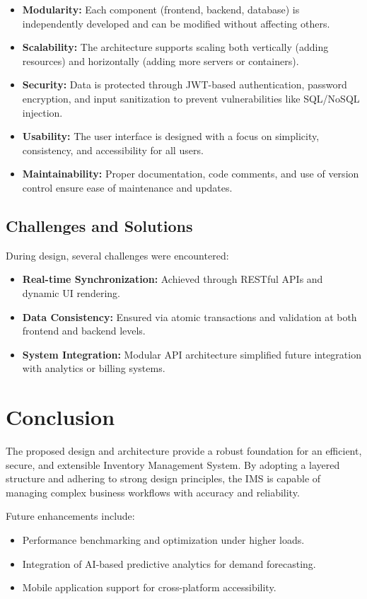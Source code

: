 \documentclass[12pt,a4paper]{article}
\begin{document}
\begin{itemize}
    \item \textbf{Modularity:} Each component (frontend, backend, database) is independently developed and can be modified without affecting others.
    \item \textbf{Scalability:} The architecture supports scaling both vertically (adding resources) and horizontally (adding more servers or containers).
    \item \textbf{Security:} Data is protected through JWT-based authentication, password encryption, and input sanitization to prevent vulnerabilities like SQL/NoSQL injection.
    \item \textbf{Usability:} The user interface is designed with a focus on simplicity, consistency, and accessibility for all users.
    \item \textbf{Maintainability:} Proper documentation, code comments, and use of version control ensure ease of maintenance and updates.
\end{itemize}

\subsection*{Challenges and Solutions}
During design, several challenges were encountered:
\begin{itemize}
    \item \textbf{Real-time Synchronization:} Achieved through RESTful APIs and dynamic UI rendering.
    \item \textbf{Data Consistency:} Ensured via atomic transactions and validation at both frontend and backend levels.
    \item \textbf{System Integration:} Modular API architecture simplified future integration with analytics or billing systems.
\end{itemize}

\section{Conclusion}
The proposed design and architecture provide a robust foundation for an efficient, secure, and extensible Inventory Management System. By adopting a layered structure and adhering to strong design principles, the IMS is capable of managing complex business workflows with accuracy and reliability.

Future enhancements include:
\begin{itemize}
    \item Performance benchmarking and optimization under higher loads.
    \item Integration of AI-based predictive analytics for demand forecasting.
    \item Mobile application support for cross-platform accessibility.
\end{itemize}
\end{document}
